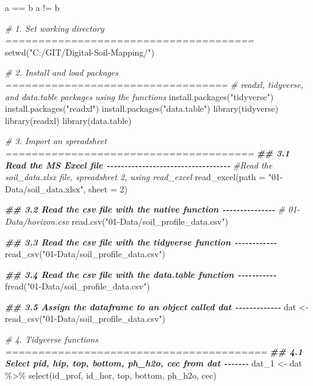 \documentclass[
  10pt,
  b5paper,
  oneside]{book}
\newenvironment{Shaded}{\begin{snugshade}}{\end{snugshade}}
\newcommand{\AttributeTok}[1]{\textcolor[rgb]{0.77,0.63,0.00}{#1}}
\newcommand{\CommentTok}[1]{\textcolor[rgb]{0.56,0.35,0.01}{\textit{#1}}}
\newcommand{\DecValTok}[1]{\textcolor[rgb]{0.00,0.00,0.81}{#1}}
\newcommand{\DocumentationTok}[1]{\textcolor[rgb]{0.56,0.35,0.01}{\textbf{\textit{#1}}}}
\newcommand{\FunctionTok}[1]{\textcolor[rgb]{0.00,0.00,0.00}{#1}}
\newcommand{\NormalTok}[1]{#1}
\newcommand{\OtherTok}[1]{\textcolor[rgb]{0.56,0.35,0.01}{#1}}
\newcommand{\SpecialCharTok}[1]{\textcolor[rgb]{0.00,0.00,0.00}{#1}}
\newcommand{\StringTok}[1]{\textcolor[rgb]{0.31,0.60,0.02}{#1}}
\begin{document}
\begin{Shaded}
\begin{Highlighting}[]
\NormalTok{a }\SpecialCharTok{==}\NormalTok{ b}
\NormalTok{a }\SpecialCharTok{!=}\NormalTok{ b}

\CommentTok{\# 1. Set working directory ======================================}
\FunctionTok{setwd}\NormalTok{(}\StringTok{"C:/GIT/Digital{-}Soil{-}Mapping/"}\NormalTok{)}

\CommentTok{\# 2. Install and load packages ==================================}
\CommentTok{\# readxl, tidyverse, and data.table packages using the functions}
\FunctionTok{install.packages}\NormalTok{(}\StringTok{"tidyverse"}\NormalTok{)}
\FunctionTok{install.packages}\NormalTok{(}\StringTok{"readxl"}\NormalTok{)}
\FunctionTok{install.packages}\NormalTok{(}\StringTok{"data.table"}\NormalTok{)}
\FunctionTok{library}\NormalTok{(tidyverse)}
\FunctionTok{library}\NormalTok{(readxl)}
\FunctionTok{library}\NormalTok{(data.table)}

\CommentTok{\# 3. Import an spreadsheet ======================================}
\DocumentationTok{\#\# 3.1 Read the MS Excel file {-}{-}{-}{-}{-}{-}{-}{-}{-}{-}{-}{-}{-}{-}{-}{-}{-}{-}{-}{-}{-}{-}{-}{-}{-}{-}{-}{-}{-}{-}{-}{-}{-}{-}{-}}
\CommentTok{\#Read the soil\_data.xlsx file, spreadsheet 2, using read\_excel }
\FunctionTok{read\_excel}\NormalTok{(}\AttributeTok{path =} \StringTok{"01{-}Data/soil\_data.xlsx"}\NormalTok{, }\AttributeTok{sheet =} \DecValTok{2}\NormalTok{)}

\DocumentationTok{\#\# 3.2 Read the csv file with the native function {-}{-}{-}{-}{-}{-}{-}{-}{-}{-}{-}{-}{-}{-}{-}}
\CommentTok{\# 01{-}Data/horizon.csv}
\FunctionTok{read.csv}\NormalTok{(}\StringTok{"01{-}Data/soil\_profile\_data.csv"}\NormalTok{)}

\DocumentationTok{\#\# 3.3 Read the csv file with the tidyverse function {-}{-}{-}{-}{-}{-}{-}{-}{-}{-}{-}{-}}
\FunctionTok{read\_csv}\NormalTok{(}\StringTok{"01{-}Data/soil\_profile\_data.csv"}\NormalTok{)}

\DocumentationTok{\#\# 3.4 Read the csv file with the data.table function {-}{-}{-}{-}{-}{-}{-}{-}{-}{-}{-}}
\FunctionTok{fread}\NormalTok{(}\StringTok{"01{-}Data/soil\_profile\_data.csv"}\NormalTok{)}

\DocumentationTok{\#\# 3.5 Assign the dataframe to an object called dat {-}{-}{-}{-}{-}{-}{-}{-}{-}{-}{-}{-}{-}}
\NormalTok{dat }\OtherTok{\textless{}{-}} \FunctionTok{read\_csv}\NormalTok{(}\StringTok{"01{-}Data/soil\_profile\_data.csv"}\NormalTok{)}

\CommentTok{\# 4. Tidyverse functions ========================================}
\DocumentationTok{\#\# 4.1 Select pid, hip, top, bottom, ph\_h2o, cec from dat {-}{-}{-}{-}{-}{-}{-}}
\NormalTok{dat\_1 }\OtherTok{\textless{}{-}}\NormalTok{ dat }\SpecialCharTok{\%\textgreater{}\%} 
  \FunctionTok{select}\NormalTok{(id\_prof, id\_hor, top, bottom, ph\_h2o, cec)}


\end{Highlighting}
\end{Shaded}
\end{document}
